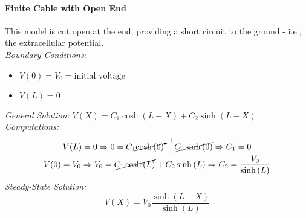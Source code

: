 \paragraph{Finite Cable with Open End} This model is cut open at the end, providing
a short circuit to the ground - i.e., the extracellular potential.\\
\textit{Boundary Conditions:}
\begin{itemize}
    \item \(V(0)=V_{0}=\text{initial voltage}\)
    \item \(V(L)=0\)
\end{itemize}
\textit{General Solution:} \(V(X)=C_{1}\cosh{(L-X)}+C_{2}\sinh{(L-X)}\)\\
\textit{Computations:}
\begin{gather*}
    V(L)=0
    \Rightarrow{0=C_{1}\cancelto{1}{\cosh{(0)}}+\cancel{C_{2}\sinh{(0)}}}
    \Rightarrow{C_{1}=0}\\
    V(0)=V_{0}
    \Rightarrow{V_{0}=\cancel{C_{1}\cosh{(L)}}+C_{2}\sinh{(L)}}
    \Rightarrow{C_{2}=\frac{V_{0}}{\sinh{(L)}}}
\end{gather*}
\textit{Steady-State Solution:}
\begin{equation*}
    V(X)=V_{0}\frac{\sinh{(L-X)}}{\sinh{(L)}}
\end{equation*}
